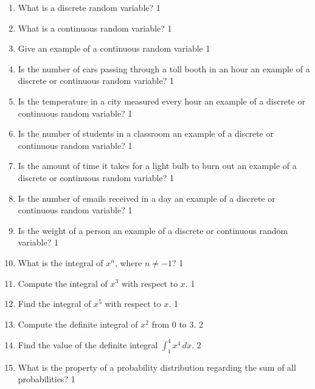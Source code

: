 \documentclass[a4paper,oneside, margin=1.4in]{book}
\begin{document}
  \begin{enumerate}

\item What is a discrete random variable? \hfill 1

\item What is a continuous random variable? \hfill 1

\item Give an example of a continuous random variable \hfill 1

\item Is the number of cars passing through a toll booth in an hour an example of a discrete or continuous random variable? \hfill 1

\item Is the temperature in a city measured every hour an example of a discrete or continuous random variable? \hfill 1

\item Is the number of students in a classroom an example of a discrete or continuous random variable? \hfill 1

\item Is the amount of time it takes for a light bulb to burn out an example of a discrete or continuous random variable? \hfill 1

\item Is the number of emails received in a day an example of a discrete or continuous random variable? \hfill 1

\item Is the weight of a person an example of a discrete or continuous random variable? \hfill 1

\item What is the integral of \( x^n \), where \( n \neq -1 \)? \hfill 1

\item Compute the integral of \( x^3 \) with respect to \( x \). \hfill 1

\item Find the integral of \( x^5 \) with respect to \( x \). \hfill 1

\item Compute the definite integral of \( x^2 \) from 0 to 3. \hfill 2

\item Find the value of the definite integral \( \int_1^4 x^4 \, dx \). \hfill 2

\item What is the property of a probability distribution regarding the sum of all probabilities? \hfill 1


\end{enumerate}
\end{document}
